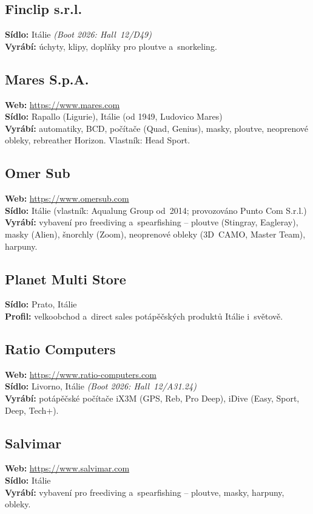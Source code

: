 \documentclass[11pt,a4paper]{article}
\begin{document}
\subsection{Finclip s.r.l.}
\textbf{Sídlo:} Itálie \quad\emph{(Boot 2026: Hall~12/D49)} \\
\textbf{Vyrábí:} úchyty, klipy, doplňky pro ploutve a~snorkeling.

\subsection{Mares S.p.A.}
\textbf{Web:} \url{https://www.mares.com} \\
\textbf{Sídlo:} Rapallo (Ligurie), Itálie (od 1949, Ludovico Mares) \\
\textbf{Vyrábí:} automatiky, BCD, počítače (Quad, Genius), masky, ploutve, neoprenové obleky, rebreather Horizon. Vlastník: Head Sport.

\subsection{Omer Sub}
\textbf{Web:} \url{https://www.omersub.com} \\
\textbf{Sídlo:} Itálie (vlastník: Aqualung Group od~2014; provozováno Punto Com S.r.l.) \\
\textbf{Vyrábí:} vybavení pro freediving a~spearfishing -- ploutve (Stingray, Eagleray), masky (Alien), šnorchly (Zoom), neoprenové obleky (3D~CAMO, Master Team), harpuny.

\subsection{Planet Multi Store}
\textbf{Sídlo:} Prato, Itálie \\
\textbf{Profil:} velkoobchod a~direct sales potápěčských produktů Itálie i~světově.

\subsection{Ratio Computers}
\textbf{Web:} \url{https://www.ratio-computers.com} \\
\textbf{Sídlo:} Livorno, Itálie \quad\emph{(Boot 2026: Hall~12/A31.24)} \\
\textbf{Vyrábí:} potápěčské počítače iX3M (GPS, Reb, Pro Deep), iDive (Easy, Sport, Deep, Tech+).

\subsection{Salvimar}
\textbf{Web:} \url{https://www.salvimar.com} \\
\textbf{Sídlo:} Itálie \\
\textbf{Vyrábí:} vybavení pro freediving a~spearfishing -- ploutve, masky, harpuny, obleky.
\end{document}
